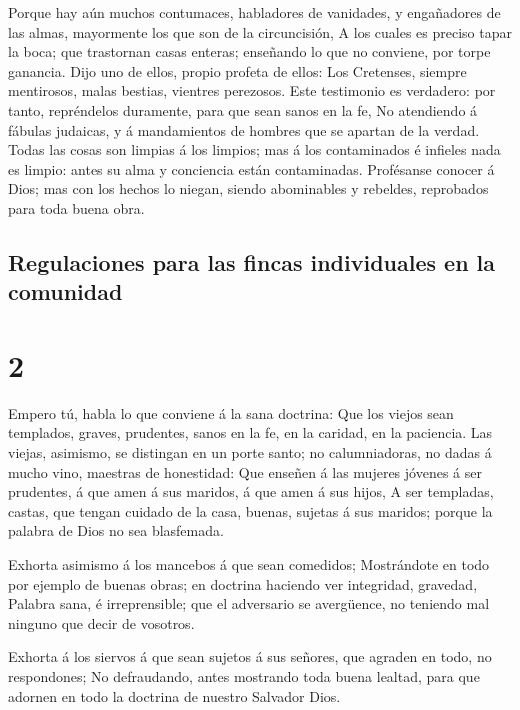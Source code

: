  Porque hay aún muchos contumaces, habladores de vanidades,
y engañadores de las almas, mayormente los que son de la circuncisión,
 A los cuales es preciso tapar la boca; que trastornan
casas enteras; enseñando lo que no conviene, por torpe ganancia.
 Dijo uno de ellos, propio profeta de ellos: Los Cretenses,
siempre mentirosos, malas bestias, vientres perezosos. 
Este testimonio es verdadero: por tanto, repréndelos duramente, para que
sean sanos en la fe,  No atendiendo á fábulas judaicas, y á
mandamientos de hombres que se apartan de la verdad.  Todas
las cosas son limpias á los limpios; mas á los contaminados é infieles
nada es limpio: antes su alma y conciencia están contaminadas.
 Profésanse conocer á Dios; mas con los hechos lo niegan,
siendo abominables y rebeldes, reprobados para toda buena obra.

\hypertarget{regulaciones-para-las-fincas-individuales-en-la-comunidad}{%
\subsection{Regulaciones para las fincas individuales en la
comunidad}\label{regulaciones-para-las-fincas-individuales-en-la-comunidad}}

\hypertarget{section-1}{%
\section{2}\label{section-1}}

 Empero tú, habla lo que conviene á la sana doctrina:
 Que los viejos sean templados, graves, prudentes, sanos en
la fe, en la caridad, en la paciencia.  Las viejas,
asimismo, se distingan en un porte santo; no calumniadoras, no dadas á
mucho vino, maestras de honestidad:  Que enseñen á las
mujeres jóvenes á ser prudentes, á que amen á sus maridos, á que amen á
sus hijos,  A ser templadas, castas, que tengan cuidado de
la casa, buenas, sujetas á sus maridos; porque la palabra de Dios no sea
blasfemada.

 Exhorta asimismo á los mancebos á que sean comedidos;
 Mostrándote en todo por ejemplo de buenas obras; en
doctrina haciendo ver integridad, gravedad,  Palabra sana, é
irreprensible; que el adversario se avergüence, no teniendo mal ninguno
que decir de vosotros.

 Exhorta á los siervos á que sean sujetos á sus señores, que
agraden en todo, no respondones;  No defraudando, antes
mostrando toda buena lealtad, para que adornen en todo la doctrina de
nuestro Salvador Dios.

